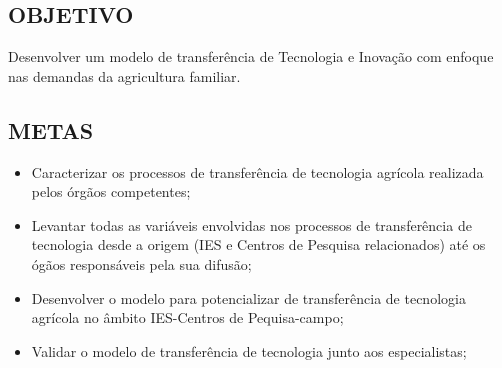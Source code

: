 \subsection{OBJETIVO}
Desenvolver um modelo de transferência de Tecnologia e Inovação com enfoque nas demandas da agricultura familiar.

\subsection{METAS}

\begin{itemize}
\item{Caracterizar os processos de transferência de tecnologia agrícola realizada pelos órgãos competentes;}
\item {Levantar todas as variáveis envolvidas nos processos de transferência de tecnologia desde a  origem (IES e Centros de Pesquisa relacionados) até os ógãos responsáveis pela sua difusão;}
\item {Desenvolver o modelo para potencializar de transferência de tecnologia agrícola no âmbito IES-Centros de Pequisa-campo;}
\item {Validar o modelo de transferência de tecnologia junto aos especialistas;}
\end{itemize}






